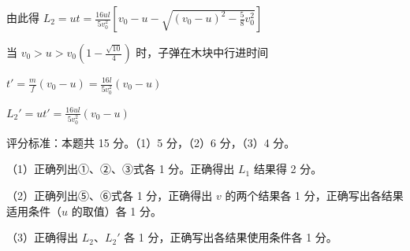 \documentclass[\gkver]{gaokaozhenti}
\begin{document}
\begin{enumerate}
{由此得 $L_{2} = ut = \frac{16ul}{5v_{0}^{2}}\left[v_{0} - u - \sqrt{(v_{0} - u)^{2} - \frac{5}{8}v_{0}^{2}}\right]$

当 $v_{0} > u > v_{0}\left(1 - \frac{\sqrt{10}}{4}\right)$ 时，子弹在木块中行进时间

$t' = \frac{m}{f}(v_{0} - u) = \frac{16l}{5v_{0}^{2}}(v_{0} - u)$

$L_{2}' = ut' = \frac{16ul}{5v_{0}^{2}}(v_{0} - u)$

评分标准：本题共 15 分。（1）5 分，（2）6 分，（3）4 分。

（1）正确列出①、②、③式各 1 分。正确得出 $L_{1}$ 结果得 2 分。

（2）正确列出⑤、⑥式各 1 分，正确得出 $v$ 的两个结果各 1 分，正确写出各结果适用条件（$u$ 的取值）各 1 分。

（3）正确得出 $L_{2}$、$L_{2}'$ 各 1 分，正确写出各结果使用条件各 1 分。
}

\end{enumerate}
\end{document}
